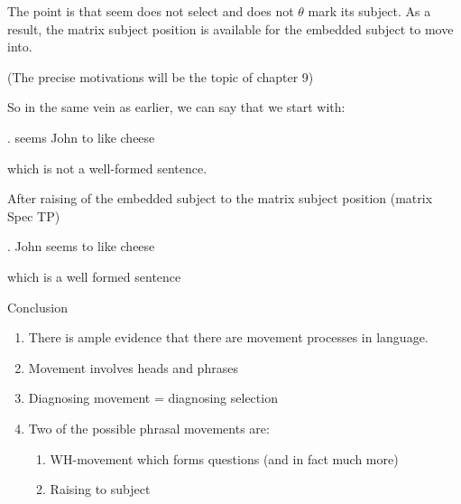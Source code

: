 \begin{frame}
  The point is that seem does not select and does not $\theta$ mark its subject.  As a result, the matrix subject position is available for the embedded subject to move into. 

(The precise motivations will be the topic of chapter 9)

\end{frame}

\begin{frame}
  So in the same vein as earlier, we can say that we start with:

\ex.
seems John to like cheese

which is not a well-formed sentence.


\end{frame}

\begin{frame}
  After raising of the embedded subject to the matrix subject position (matrix Spec TP)

\ex.
John seems to like cheese

which is a well formed sentence


\end{frame}

\begin{frame}
  {Conclusion}

  \begin{enumerate}
  \item There is ample evidence that there are movement processes in language.
  \item Movement involves heads and phrases
  \item Diagnosing movement = diagnosing selection
  \item Two of the possible phrasal movements are:
    \begin{enumerate}
    \item WH-movement which forms questions (and in fact much more)
    \item Raising to subject
    \end{enumerate}

  \end{enumerate}
\end{frame}





